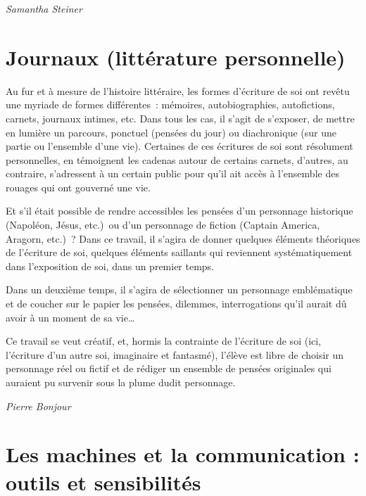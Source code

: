 \documentclass[
  10pt,
  french,
  a5paper,
  openany]{book}
\newenvironment{signature}{\begin{flushright}}{\end{flushright}}
\begin{document}
\begin{signature}
\emph{Samantha Steiner}

\end{signature}

\hypertarget{journaux-littuxe9rature-personnelle}{%
\chapter{Journaux (littérature personnelle)}\label{journaux-littuxe9rature-personnelle}}

Au fur et à mesure de l'histoire littéraire, les formes d'écriture de soi ont revêtu une myriade de formes différentes~: mémoires, autobiographies, autofictions, carnets, journaux intimes, etc. Dans tous les cas, il s'agit de s'exposer, de mettre en lumière un parcours, ponctuel (pensées du jour) ou diachronique (sur une partie ou l'ensemble d'une vie). Certaines de ces écritures de soi sont résolument personnelles, en témoignent les cadenas autour de certains carnets, d'autres, au contraire, s'adressent à un certain public pour qu'il ait accès à l'ensemble des rouages qui ont gouverné une vie.

Et s'il était possible de rendre accessibles les pensées d'un personnage historique (Napoléon, Jésus, etc.)~ou d'un personnage de fiction (Captain America, Aragorn, etc.)~? Dans ce travail, il s'agira de donner quelques éléments théoriques de l'écriture de soi, quelques éléments saillants qui reviennent systématiquement dans l'exposition de soi, dans un premier temps.

Dans un deuxième temps, il s'agira de sélectionner un personnage emblématique et de coucher sur le papier les pensées, dilemmes, interrogations qu'il aurait dû avoir à un moment de sa vie\ldots{}

Ce travail se veut créatif, et, hormis la contrainte de l'écriture de soi (ici, l'écriture d'un autre soi, imaginaire et fantasmé), l'élève est libre de choisir un personnage réel ou fictif et de rédiger un ensemble de pensées originales qui auraient pu survenir sous la plume dudit personnage.

\begin{signature}
\emph{Pierre Bonjour}

\end{signature}

\hypertarget{les-machines-et-la-communication-outils-et-sensibilituxe9s}{%
\chapter{\texorpdfstring{Les machines et la communication : \linebreak outils et sensibilités}{Les machines et la communication : outils et sensibilités}}\label{les-machines-et-la-communication-outils-et-sensibilituxe9s}}
\end{document}
